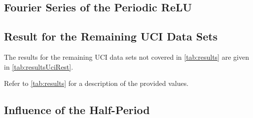 \documentclass[11pt, a4paper, conference, romanappendices, twocolumn]{IEEEtran}
\begin{document}
	\appendix

	\subsection{Fourier Series of the Periodic \acs{ReLU}}  \label{app:perelu}
	

	\subsection{Result for the Remaining \acs{UCI} Data Sets}  \label{app:remainingResults}
	The results for the remaining \ac{UCI} data sets not covered in \cref{tab:results} are given in \cref{tab:resultsUciRest}.
	\begin{table*}
		\centering
		\tabResultsUciRest
		\caption{Refer to \cref{tab:results} for a description of the provided values.}
		\label{tab:resultsUciRest}
	\end{table*}

	\subsection{Influence of the Half-Period}  \label{app:halfPeriodInfluence}
	
\end{document}
